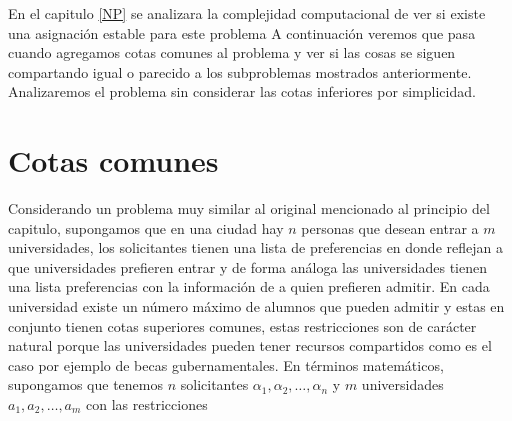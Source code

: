 En el capitulo \ref{NP} se analizara la complejidad computacional de ver si existe una asignación estable para este problema %
A continuación veremos que pasa cuando agregamos cotas comunes al problema y ver si las cosas se siguen compartando igual o parecido a los subproblemas mostrados anteriormente. Analizaremos el problema sin considerar las cotas inferiores por simplicidad. 

\section{Cotas comunes}
Considerando un problema muy similar al original mencionado al principio del capitulo,
 supongamos que en una ciudad hay $n$ personas que desean entrar a $m$ universidades,
 los solicitantes tienen una lista de preferencias en donde reflejan a que universidades prefieren entrar y de forma análoga las universidades tienen una lista preferencias con la información de a quien prefieren admitir. 
 En cada universidad existe un número máximo de alumnos que pueden admitir y estas en conjunto tienen cotas superiores comunes,
 estas restricciones son de carácter natural porque las universidades pueden tener recursos compartidos como es el caso por ejemplo de becas gubernamentales. 
 En términos matemáticos, supongamos que tenemos $n$ solicitantes $\alpha_1,\alpha_2,\ldots,\alpha_n$ y $m$ universidades $a_1, a_2,\ldots,a_m$ con las restricciones
